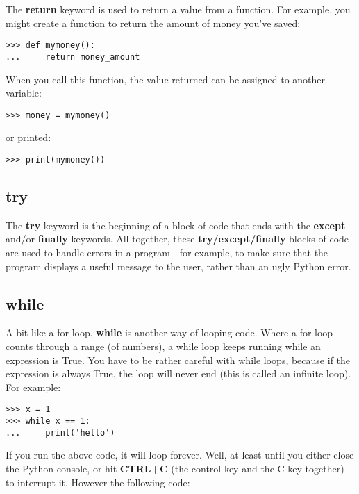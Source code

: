 The \textbf{return} keyword is used to return a value from a function.  For example, you might create a function to return the amount of money you've saved:

\begin{Verbatim}[frame=single]
>>> def mymoney():
...     return money_amount
\end{Verbatim}

\noindent
When you call this function, the value returned can be assigned to another variable:

\begin{Verbatim}[frame=single]
>>> money = mymoney()
\end{Verbatim}

\noindent
or printed:

\begin{Verbatim}[frame=single]
>>> print(mymoney())
\end{Verbatim}

\subsection*{try}

The \textbf{try} keyword is the beginning of a block of code that ends with the \textbf{except} and/or \textbf{finally} keywords.  All together, these \textbf{try/except/finally} blocks of code are used to handle errors in a program---for example, to make sure that the program displays a useful message to the user, rather than an ugly Python error.

\subsection*{while}

A bit like a for-loop, \textbf{while} is another way of looping code.  Where a for-loop counts through a range (of numbers), a while loop keeps running while an expression is True.  You have to be rather careful with while loops, because if the expression is always True, the loop will never end (this is called an infinite loop).  For example:

\begin{Verbatim}[frame=single]
>>> x = 1
>>> while x == 1:
...     print('hello')
\end{Verbatim}

If you run the above code, it will loop forever.  Well, at least until you either close the Python console, or hit \textbf{CTRL+C} (the control key and the C key together) to interrupt it. However the following code:

